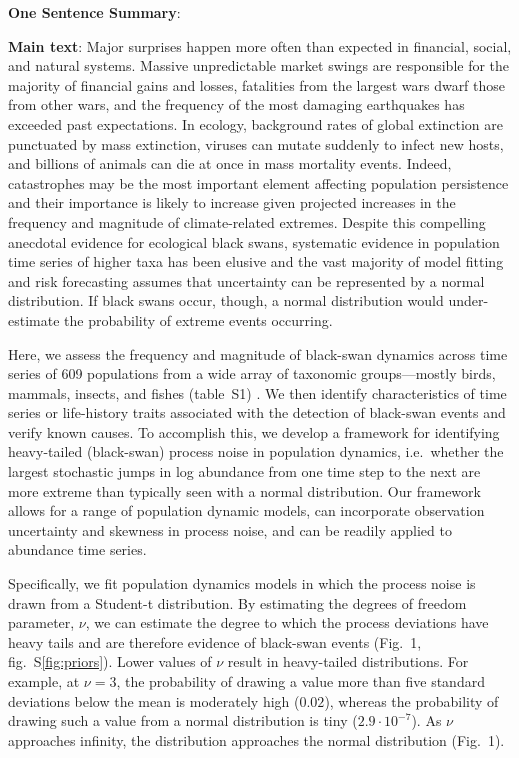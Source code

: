 \bigskip
\bigskip

\textbf{One Sentence Summary}:

\textbf{Main text}:
Major surprises happen more often than expected in financial, social, and natural systems\cite{taleb2007, sornette2009, may2008}. Massive unpredictable market swings are responsible for the majority of financial gains and losses\cite{taleb2007}, fatalities from the largest wars dwarf those from other wars\cite{newman2005}, and the frequency of the most damaging earthquakes has exceeded past expectations\cite{sornette2009}. In ecology, background rates of global extinction are punctuated by mass extinction\cite{harnik2012}, viruses can mutate suddenly to infect new hosts, and billions of animals can die at once in mass mortality events\cite{fey2015}. Indeed, catastrophes may be the most important element affecting population persistence\cite{mangel1994} and their importance is likely to increase given projected increases in the frequency and magnitude of climate-related extremes\cite{ipcc2012}. Despite this compelling anecdotal evidence for ecological black swans, systematic evidence in population time series of higher taxa has been elusive\cite{keitt1998, allen2001, halley2002} and the vast majority of model fitting and risk forecasting assumes that uncertainty can be represented by a normal distribution\cite{brook2006a, knape2012}. If black swans occur, though, a normal distribution would under-estimate the probability of extreme events occurring.

Here, we assess the frequency and magnitude of black-swan dynamics across time series of 609 populations from a wide array of taxonomic groups---mostly birds, mammals, insects, and fishes (table~S1) \cite{SOM}. We then identify characteristics of time series or life-history traits associated with the detection of black-swan events and verify known causes. To accomplish this, we develop a framework for identifying heavy-tailed (black-swan) process noise in population dynamics, i.e.~whether the largest stochastic jumps in log abundance from one time step to the next are more extreme than typically seen with a normal distribution. Our framework allows for a range of population dynamic models, can incorporate observation uncertainty and skewness in process noise, and can be readily applied to abundance time series.

Specifically, we fit population dynamics models in which the process noise is drawn from a Student-t distribution. By estimating the degrees of freedom parameter, \(\nu\), we can estimate the degree to which the process deviations have heavy tails and are therefore evidence of black-swan events (Fig.~1, fig.~S\ref{fig:priors}). Lower values of \(\nu\) result in heavy-tailed distributions. For example, at \(\nu = 3\), the probability of drawing a value more than five standard deviations below the mean is moderately high (\(0.02\)), whereas the probability of drawing such a value from a normal distribution is tiny (\(2.9\cdot10^{-7}\)). As \(\nu\) approaches infinity, the distribution approaches the normal distribution (Fig.~1).

